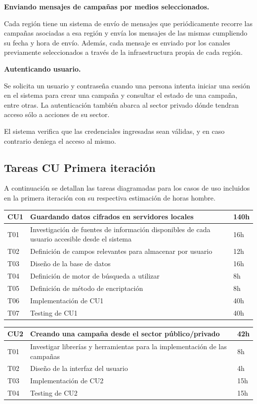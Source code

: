 \documentclass[a4paper, 10pt, twoside]{article}
\begin{document}
\textbf{Enviando mensajes de campañas por medios seleccionados.}

Cada región tiene un sistema de envío de mensajes que periódicamente recorre las campañas asociadas a esa región y envía los mensajes de las mismas cumpliendo su fecha y hora de envío. Además, cada mensaje es enviado por los canales previamente seleccionados a través de la infraestructura propia de cada región.

\textbf{Autenticando usuario.}

Se solicita un usuario y contraseña cuando una persona intenta iniciar una sesión en el sistema para crear una campaña y consultar el estado de una campaña, entre otras. La autenticación también abarca al sector privado dónde tendran acceso sólo a acciones de su sector.

El sistema verifica que las credenciales ingresadas sean válidas, y en caso contrario deniega el acceso al mismo.

\subsection{Tareas CU Primera iteración}
A continuación se detallan las tareas diagramadas para los casos de uso incluidos en la primera iteración con su respectiva estimación de horas hombre.
\\

\begin{tabular}{lp{13cm}l}
  \hline
  CU1 & Guardando datos cifrados en servidores locales & 140h \\
  \hline
  T01 & Investigación de fuentes de información disponibles de cada usuario accesible desde el sistema & 16h \\
  T02 & Definición de campos relevantes para almacenar por usuario & 12h \\
  T03 & Diseño de la base de datos & 16h \\
  T04 & Definición de motor de búsqueda a utilizar & 8h \\
  T05 & Definición de método de encriptación & 8h \\
  T06 & Implementación de CU1 & 40h\\
  T07 & Testing de CU1 & 40h \\
  \hline
\end{tabular}

\vspace{1em}

\begin{tabular}{lp{13cm}l}
  \hline
  CU2 & Creando una campaña desde el sector público/privado & 42h \\
  \hline
  T01 & Investigar librerías y herramientas para la implementación de las campañas & 8h \\
  T02 & Diseño de la interfaz del usuario & 4h \\
  T03 & Implementación de CU2 & 15h \\
  T04 & Testing de CU2 & 15h \\
  \hline
\end{tabular}
\end{document}
